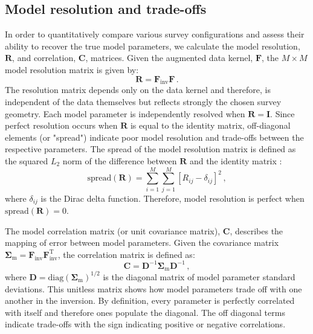 \subsection{Model resolution and trade-offs}
In order to quantitatively compare various survey configurations and assess their ability to recover the true model parameters, we calculate the model resolution, $\mathbf{R}$, and correlation, $\mathbf{C}$, matrices. Given the augmented data kernel, $\mathbf{F}$, the $M \times M$ model resolution matrix is given by:
\begin{equation}
\mathbf{R} = \mathbf{F}_{\text{inv}} \mathbf{F} \,.
\end{equation}
The resolution matrix depends only on the data kernel and therefore, is independent of the data themselves but reflects strongly the chosen survey geometry. Each model parameter is independently resolved when $\mathbf{R}=\mathbf{I}$. Since perfect resolution occurs when $\mathbf{R}$ is equal to the identity matrix, off-diagonal elements (or "spread") indicate poor model resolution and trade-offs between the respective parameters. The spread of the model resolution matrix is defined as the squared $L_2$ norm of the difference between $\mathbf{R}$ and the identity matrix \citep{William:2012vh}:
\begin{equation}
\text{spread}(\mathbf{R}) = \sum_{i=1}^M\sum_{j=1}^M \left[ R_{ij}-\delta_{ij}\right]^2 \,,
\end{equation}
where $\delta_{ij}$ is the Dirac delta function. Therefore, model resolution is perfect when $\text{spread}(\mathbf{R})=0$.

The model correlation matrix (or unit covariance matrix), $\mathbf{C}$, describes the mapping of error between model parameters. Given the covariance matrix $\mathbf{\Sigma}_{\text{m}} = \mathbf{F}_{\text{inv}} \mathbf{F}_{\text{inv}}^{\text{T}}$, the correlation matrix is defined as:
\begin{equation}
\mathbf{C} = \mathbf{D}^{-1}\mathbf{\Sigma}_{\text{m}}\mathbf{D}^{-1} \,,
\end{equation}
where $\mathbf{D} = \text{diag}(\mathbf{\Sigma}_{\text{m}})^{1/2}$ is the diagonal matrix of model parameter standard deviations. This unitless matrix shows how model parameters trade off with one another in the inversion. By definition, every parameter is perfectly correlated with itself and therefore ones populate the diagonal. The off diagonal terms indicate trade-offs with the sign indicating positive or negative correlations.







